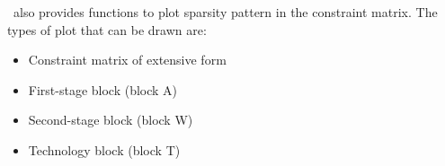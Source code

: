 \siplibjl\ also provides functions to plot sparsity pattern in the constraint matrix. The types of plot that can be drawn are:
\begin{itemize}
	\item Constraint matrix of extensive form
	\item First-stage block (block A)
	\item Second-stage block (block W)
	\item Technology block (block T)
\end{itemize}



